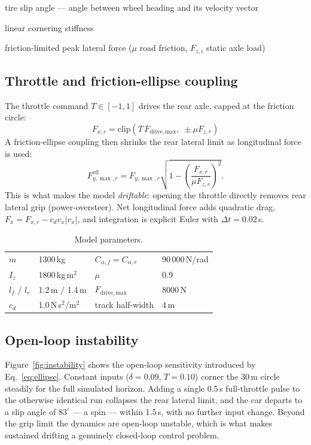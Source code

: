 \documentclass[11pt]{article}
\begin{document}
\begin{description}[nosep, itemsep=2pt]
\item[$\alpha_i$] tire slip angle --- angle between wheel heading and its velocity vector
\item[$C_{\alpha,i}$] linear cornering stiffness
\item[$F_{y,\max,i} = \mu F_{z,i}$] friction-limited peak lateral force ($\mu$ road friction, $F_{z,i}$ static axle load)
\end{description}

\subsection{Throttle and friction-ellipse coupling}
The throttle command $T\in[-1,1]$ drives the rear axle, capped at the friction circle:
\[
F_{x,r} = \mathrm{clip}\!\left(T\,F_{\mathrm{drive,max}},\;\pm\mu F_{z,r}\right)
\]
A friction-ellipse coupling then shrinks the rear lateral limit as longitudinal force is used:
\begin{equation}
F_{y,\max,r}^{\mathrm{eff}} = F_{y,\max,r}
\sqrt{1 - \left(\frac{F_{x,r}}{\mu F_{z,r}}\right)^{2}}.
\label{eq:ellipse}
\end{equation}
This is what makes the model \emph{driftable}: opening the throttle directly removes rear
lateral grip (power-oversteer). Net longitudinal force adds quadratic drag,
$F_x = F_{x,r} - c_d v_x |v_x|$, and integration is explicit Euler with $\Delta t = 0.02$\,s.

\begin{table}[h]\centering
\caption{Model parameters.}
\begin{tabular}{llll}
\toprule
$m$ & 1300\,kg & $C_{\alpha,f}=C_{\alpha,r}$ & 90\,000\,N/rad \\
$I_z$ & 1800\,kg\,m$^2$ & $\mu$ & 0.9 \\
$l_f$ / $l_r$ & 1.2\,m / 1.4\,m & $F_{\mathrm{drive,max}}$ & 8000\,N \\
$c_d$ & 1.0\,N\,s$^2$/m$^2$ & track half-width & 4\,m \\
\bottomrule
\end{tabular}
\end{table}

\subsection{Open-loop instability}
Figure~\ref{fig:instability} shows the open-loop sensitivity introduced by
Eq.~\eqref{eq:ellipse}. Constant inputs ($\delta = 0.09$, $T = 0.10$)
corner the 30\,m circle steadily for the full simulated horizon. Adding a
single 0.5\,s full-throttle pulse to the otherwise identical run collapses
the rear lateral limit, and the car departs to a slip angle of
$83^\circ$ --- a spin --- within 1.5\,s, with no further input change.
Beyond the grip limit the dynamics are open-loop unstable, which is what
makes sustained drifting a genuinely closed-loop control problem.
\end{document}
